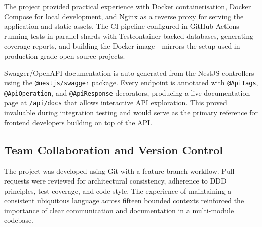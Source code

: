 The project provided practical experience with Docker containerisation, Docker Compose for local development, and Nginx as a reverse proxy for serving the application and static assets. The CI pipeline configured in GitHub Actions---running tests in parallel shards with Testcontainer-backed databases, generating coverage reports, and building the Docker image---mirrors the setup used in production-grade open-source projects.

Swagger/OpenAPI documentation is auto-generated from the NestJS controllers using the \texttt{@nestjs/swagger} package. Every endpoint is annotated with \texttt{@ApiTags}, \texttt{@ApiOperation}, and \texttt{@ApiResponse} decorators, producing a live documentation page at \texttt{/api/docs} that allows interactive API exploration. This proved invaluable during integration testing and would serve as the primary reference for frontend developers building on top of the API.

\subsection{Team Collaboration and Version Control}

The project was developed using Git with a feature-branch workflow. Pull requests were reviewed for architectural consistency, adherence to DDD principles, test coverage, and code style. The experience of maintaining a consistent ubiquitous language across fifteen bounded contexts reinforced the importance of clear communication and documentation in a multi-module codebase.
